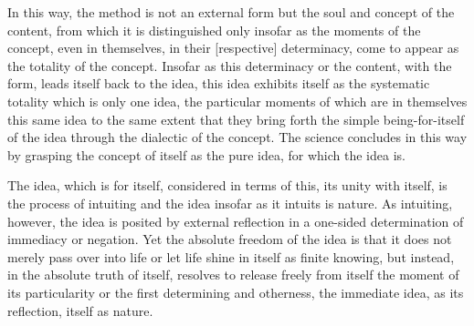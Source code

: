 In this way, the method is not an external form but
the soul and concept of the content,
from which it is distinguished only insofar as
the moments of the concept, even in themselves,
in their [respective] determinacy,
come to appear as the totality of the concept.
Insofar as this determinacy or the content, with the form,
leads itself back to the idea, this idea exhibits itself
as the systematic totality which is only one idea,
the particular moments of which are in themselves this same idea
to the same extent that they bring forth the simple being-for-itself
of the idea through the dialectic of the concept.
The science concludes in this way by grasping the concept of
itself as the pure idea, for which the idea is.

The idea, which is for itself, considered in terms of this, its unity with itself,
is the process of intuiting and the idea insofar as it intuits is nature.
As intuiting, however, the idea is posited by external reflection
in a one-sided determination of immediacy or negation.
Yet the absolute freedom of the idea is that it does not merely pass over into life
or let life shine in itself as finite knowing, but instead,
in the absolute truth of itself, resolves to release freely from itself
the moment of its particularity or the first determining and otherness,
the immediate idea, as its reflection, itself as nature.
